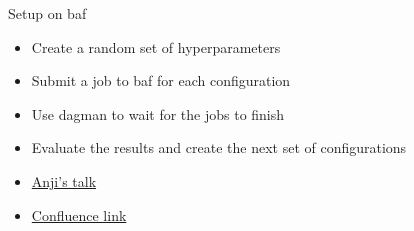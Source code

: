 \begin{frame}{Setup on baf}
    \begin{itemize}
        \item Create a random set of hyperparameters
        \vspace{0.2cm}
        \item Submit a job to baf for each configuration
        \vspace{0.2cm}
        \item Use dagman to wait for the jobs to finish
        \vspace{0.2cm}
        \item Evaluate the results and create the next set of configurations
        \vspace{0.2cm}
        \item \href{https://indico.desy.de/indico/event/23852/session/3/contribution/5/material/slides/0.pdf}{Anji's talk}
        \item \href{https://confluence.team.uni-bonn.de/display/PHYIT/Job+restarting+with+Dagman}{Confluence link}
    \end{itemize}
    
\end{frame}